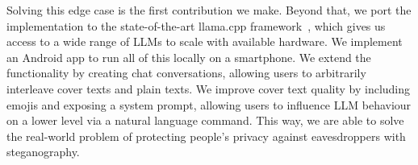Solving this edge case is the first contribution we make. Beyond that, we port the implementation to the state-of-the-art llama.cpp framework~\cite{gerganovGgerganovLlamacpp2024}, which gives us access to a wide range of \glspl{LLM} to scale with available hardware. We implement an Android app to run all of this locally on a smartphone. We extend the functionality by creating chat conversations, allowing users to arbitrarily interleave cover texts and plain texts. We improve cover text quality by including emojis and exposing a system prompt, allowing users to influence \gls{LLM} behaviour on a lower level via a natural language command. This way, we are able to solve the real-world problem of protecting people's privacy against eavesdroppers with steganography.




